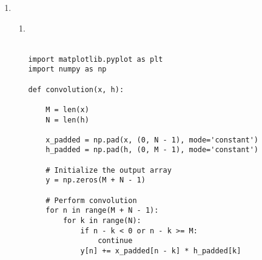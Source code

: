 \documentclass[10pt,a4paper, margin=1in]{article}
\begin{document}
\begin{enumerate}
\begin{enumerate}
	\item %
    \end{enumerate}
    
\item %
    \begin{enumerate}
        \begin{verbatim}

        import numpy as np
        import matplotlib.pyplot as plt
        
        
        input_data = np.genfromtxt('hw2_signal.csv', delimiter=',')
        start_index = int(input_data[0])
        x = input_data[1:]
        
        
        h = np.zeros_like(x)
        h[start_index - 5] = 1
        
        # Perform discrete convolution of x[n] and h[n]
        y = np.zeros_like(x)
        for n in range(len(x)):
            for k in range(len(h)):
                if n - k >= 0:
                    y[n] += x[k] * h[n - k]
        
        
        n = np.arange(len(x))
        plt.stem(n, x, linefmt='b-', markerfmt='bo', label='Input Signal x[n]')
        plt.stem(n, y, linefmt='r-', markerfmt='ro', label='Output Signal y[n]')
        plt.xlabel('n')
        plt.ylabel('Amplitude')
        plt.legend()
        plt.show()

        \end{verbatim}


    
    
    
    \item %
        \begin{verbatim}
            


import matplotlib.pyplot as plt
import numpy as np

def convolution(x, h):

    M = len(x)
    N = len(h)

    x_padded = np.pad(x, (0, N - 1), mode='constant')
    h_padded = np.pad(h, (0, M - 1), mode='constant')

    # Initialize the output array
    y = np.zeros(M + N - 1)

    # Perform convolution
    for n in range(M + N - 1):
        for k in range(N):
            if n - k < 0 or n - k >= M:
                continue
            y[n] += x_padded[n - k] * h_padded[k]


\end{verbatim}
\end{enumerate}
\end{enumerate}
\end{document}
